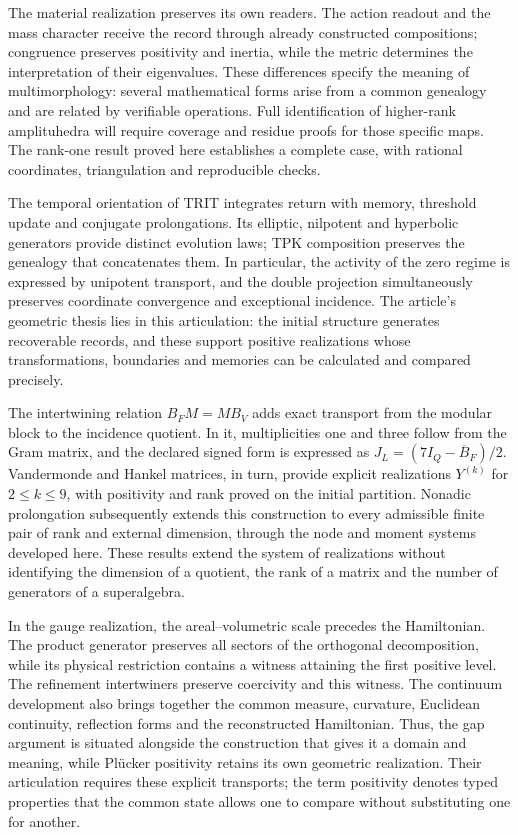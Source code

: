 \documentclass[a4paper,10pt]{article}
\theoremstyle{definition}\newtheorem{definition}[theorem]{Definition}
\theoremstyle{remark}\newtheorem{remark}[theorem]{Remark}
\numberwithin{equation}{section}
\begin{document}
The material realization preserves its own readers. The action
readout and the mass character receive the record through already constructed
compositions; congruence preserves positivity and inertia, while the
metric determines the interpretation of their eigenvalues. These differences
specify the meaning of multimorphology: several mathematical forms
arise from a common genealogy and are related by verifiable operations.
Full identification of higher-rank amplituhedra will require
coverage and residue proofs for those specific maps. The rank-one result
proved here establishes a complete case, with rational
coordinates, triangulation and reproducible checks.

The temporal orientation of TRIT integrates return with memory,
threshold update and conjugate prolongations. Its elliptic,
nilpotent and hyperbolic generators provide distinct evolution
laws; TPK composition preserves the genealogy that
concatenates them. In particular, the activity of the zero regime is expressed
by unipotent transport, and the double projection simultaneously preserves
coordinate convergence and exceptional incidence. The article's geometric
thesis lies in this articulation: the initial structure
generates recoverable records, and these support positive
realizations whose transformations, boundaries and memories can be calculated
and compared precisely.

The intertwining relation \(B_FM=MB_V\) adds exact transport from the
modular block to the incidence quotient. In it, multiplicities
one and three follow from the Gram matrix, and the declared signed form
is expressed as \(J_L=(7I_Q-\overline B_F)/2\). Vandermonde
and Hankel matrices, in turn, provide explicit realizations
\(Y^{(k)}\) for \(2\le k\le9\), with positivity and rank proved
on the initial partition. Nonadic prolongation subsequently extends
this construction to every admissible finite pair of rank and external
dimension, through the node and moment systems developed here.
These results extend the system of realizations without identifying
the dimension of a quotient, the rank of a matrix and the number of
generators of a superalgebra.

In the gauge realization, the areal--volumetric scale precedes the
Hamiltonian. The product generator preserves all sectors of the
orthogonal decomposition, while its physical restriction contains a
witness attaining the first positive level. The refinement
intertwiners preserve coercivity and this witness. The continuum
development also brings together the common measure, curvature, Euclidean
continuity, reflection forms and the reconstructed Hamiltonian. Thus,
the gap argument is situated alongside the construction that gives it
a domain and meaning, while Plücker positivity retains its own geometric
realization. Their articulation requires these explicit transports;
the term positivity denotes typed properties that the common state
allows one to compare without substituting one for another.
\end{document}

